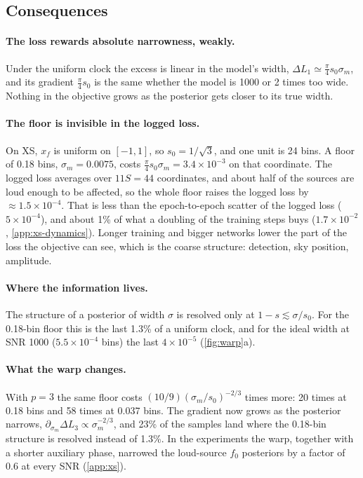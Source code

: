 \subsection{Consequences}

\paragraph{The loss rewards absolute narrowness, weakly.}
Under the uniform clock the excess is linear in the model's width,
$\Delta L_1\simeq\frac\pi4 s_0\sigma_m$, and its gradient $\frac\pi4 s_0$ is the same whether
the model is 1000 or 2 times too wide. Nothing in the objective grows as the posterior gets
closer to its true width.

\paragraph{The floor is invisible in the logged loss.}
On XS, $x_f$ is uniform on $[-1,1]$, so $s_0 = 1/\sqrt3$, and one unit is 24 bins. A floor of
0.18 bins, $\sigma_m = 0.0075$, costs $\frac\pi4 s_0\sigma_m = 3.4\times10^{-3}$ on that
coordinate. The logged loss averages over $11S = 44$ coordinates, and about half of the
sources are loud enough to be affected, so the whole floor raises the logged loss by
$\approx1.5\times10^{-4}$. That is less than the epoch-to-epoch scatter of the logged loss
($5\times10^{-4}$), and about 1\% of what a doubling of the training steps buys
($1.7\times10^{-2}$, \cref{app:xs-dynamics}). Longer training and bigger networks lower the
part of the loss the objective can see, which is the coarse structure: detection, sky
position, amplitude.

\paragraph{Where the information lives.}
The structure of a posterior of width $\sigma$ is resolved only at $1-s\lesssim\sigma/s_0$. For
the 0.18-bin floor this is the last 1.3\% of a uniform clock, and for the ideal width at SNR
1000 ($5.5\times10^{-4}$ bins) the last $4\times10^{-5}$ (\cref{fig:warp}a).

\paragraph{What the warp changes.}
With $p=3$ the same floor costs $(10/9)(\sigma_m/s_0)^{-2/3}$ times more: 20 times at 0.18
bins and 58 times at 0.037 bins. The gradient now grows as the posterior narrows,
$\partial_{\sigma_m}\Delta L_3\propto\sigma_m^{-2/3}$, and 23\% of the samples land where the
0.18-bin structure is resolved instead of 1.3\%. In the experiments the warp, together with a shorter auxiliary
phase, narrowed the loud-source $f_0$ posteriors by a factor of 0.6 at every SNR (\cref{app:xs}).

